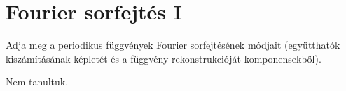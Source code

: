 \documentclass[../main.tex]{subfiles}
\begin{document}
\section{Fourier sorfejtés I}

\begin{fulltheorem}
  Adja meg a periodikus függvények Fourier sorfejtésének módjait
  (együtthatók kiszámításának képletét és a függvény rekonstrukcióját
  komponensekből).
\end{fulltheorem}

Nem tanultuk.
\end{document}
